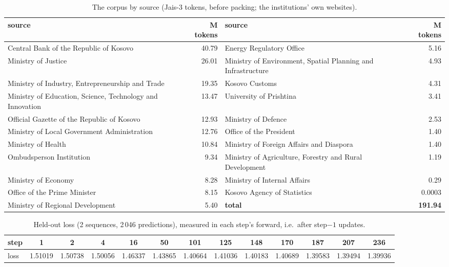 \documentclass[11pt]{article}
\begin{document}
\begin{table}[t]\centering\small
\caption{The corpus by source (Jais-3 tokens, before packing; the institutions' own websites).}\label{tab:corpus}
{\footnotesize\begin{tabular}{p{5.7cm}r@{\hspace{1.6em}}p{5.7cm}r}\toprule
source & M tokens & source & M tokens \\\midrule
Central Bank of the Republic of Kosovo & 40.79 & Energy Regulatory Office & 5.16 \\
Ministry of Justice & 26.01 & Ministry of Environment, Spatial Planning and Infrastructure & 4.93 \\
Ministry of Industry, Entrepreneurship and Trade & 19.35 & Kosovo Customs & 4.31 \\
Ministry of Education, Science, Technology and Innovation & 13.47 & University of Prishtina & 3.41 \\
Official Gazette of the Republic of Kosovo & 12.93 & Ministry of Defence & 2.53 \\
Ministry of Local Government Administration & 12.76 & Office of the President & 1.40 \\
Ministry of Health & 10.84 & Ministry of Foreign Affairs and Diaspora & 1.40 \\
Ombudsperson Institution & 9.34 & Ministry of Agriculture, Forestry and Rural Development & 1.19 \\
Ministry of Economy & 8.28 & Ministry of Internal Affairs & 0.29 \\
Office of the Prime Minister & 8.15 & Kosovo Agency of Statistics & 0.0003 \\
Ministry of Regional Development & 5.40 & \textbf{total} & \textbf{191.94} \\\bottomrule
\end{tabular}}
\end{table}

\begin{table}[t]\centering\small
\caption{Held-out loss (2 sequences, 2\,046 predictions), measured in each step's forward, i.e.\ after step$-1$ updates.}\label{tab:loss}
\footnotesize\setlength{\tabcolsep}{2.9pt}
\begin{tabular}{lcccccccccccc}\toprule
step & 1 & 2 & 4 & 16 & 50 & 101 & 125 & 148 & 170 & 187 & 207 & 236 \\\midrule
loss & 1.51019 & 1.50738 & 1.50056 & 1.46337 & 1.43865 & 1.40664 & 1.41036 & 1.40183 & 1.40689 & 1.39583 & 1.39494 & 1.39936 \\\bottomrule
\end{tabular}
\end{table}
\end{document}
